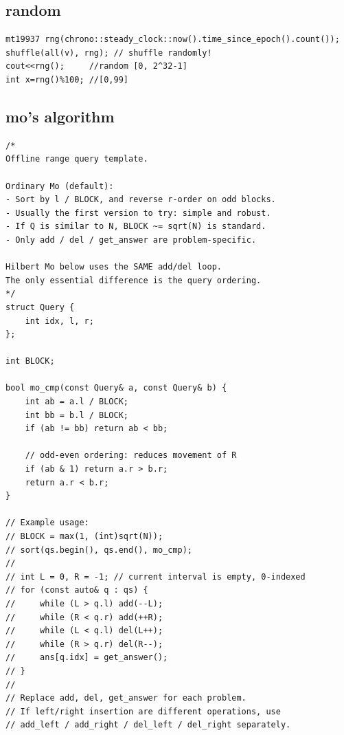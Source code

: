 \documentclass[landscape, 8pt, a4paper, oneside, twocolumn]{extarticle}
\begin{document}
\subsection{random}
\begin{verbatim}
mt19937 rng(chrono::steady_clock::now().time_since_epoch().count());
shuffle(all(v), rng); // shuffle randomly!
cout<<rng();     //random [0, 2^32-1]
int x=rng()%100; //[0,99]
\end{verbatim}
\subsection{mo's algorithm}
\begin{verbatim}
/*
Offline range query template.

Ordinary Mo (default):
- Sort by l / BLOCK, and reverse r-order on odd blocks.
- Usually the first version to try: simple and robust.
- If Q is similar to N, BLOCK ~= sqrt(N) is standard.
- Only add / del / get_answer are problem-specific.

Hilbert Mo below uses the SAME add/del loop.
The only essential difference is the query ordering.
*/
struct Query {
    int idx, l, r;
};

int BLOCK;

bool mo_cmp(const Query& a, const Query& b) {
    int ab = a.l / BLOCK;
    int bb = b.l / BLOCK;
    if (ab != bb) return ab < bb;

    // odd-even ordering: reduces movement of R
    if (ab & 1) return a.r > b.r;
    return a.r < b.r;
}

// Example usage:
// BLOCK = max(1, (int)sqrt(N));
// sort(qs.begin(), qs.end(), mo_cmp);
//
// int L = 0, R = -1; // current interval is empty, 0-indexed
// for (const auto& q : qs) {
//     while (L > q.l) add(--L);
//     while (R < q.r) add(++R);
//     while (L < q.l) del(L++);
//     while (R > q.r) del(R--);
//     ans[q.idx] = get_answer();
// }
//
// Replace add, del, get_answer for each problem.
// If left/right insertion are different operations, use
// add_left / add_right / del_left / del_right separately.
\end{verbatim}
\end{document}
